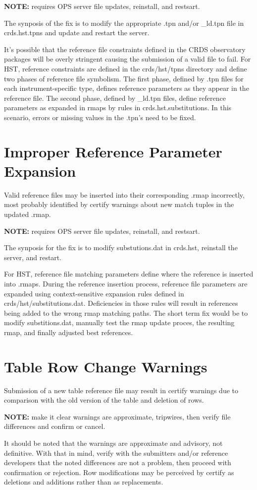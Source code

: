 \documentclass[letterpaper,10pt,english]{sphinxmanual}
\begin{document}
\textbf{NOTE:} requires OPS server file updates, reinstall, and restsart.

The synposis of the fix is to modify the appropriate .tpn and/or \_ld.tpn file in crds.hst.tpns and update and
restart the server.

It's possible that the reference file constraints defined in the CRDS observatory packages will be overly stringent
causing the submission of a valid file to fail.   For HST,  reference constraints are defined in the crds/hst/tpns
directory and define two phases of reference file symbolism.   The first phase,  defined by .tpn files for each
instrument-specific type,  defines reference parameters as they appear in the reference file.  The second phase,
defined by \_ld.tpn files,  define reference parameters as expanded in rmaps by rules in crds.hst.substitutions.
In this scenario,  errors or missing values in the .tpn's need to be fixed.


\section{Improper Reference Parameter Expansion}
\label{server_guide:improper-reference-parameter-expansion}
Valid reference files may be inserted into their corresponding .rmap incorrectly,  most probably identified
by certify warnings about new match tuples in the updated .rmap.

\textbf{NOTE:} requires OPS server file updates, reinstall, and restsart.

The synposis for the fix is to modify substutions.dat in crds.hst,  reinstall the server, and restart.

For HST, reference file matching parameters define where the reference is inserted into .rmaps.
During the reference insertion process,  reference file parameters are expanded using context-sensitive expansion
rules defined in crds/hst/substitutions.dat.  Deficiencies in those rules will result in references being added
to the wrong rmap matching paths.   The short term fix would be to modify substitions.dat,  manually test the rmap
update proces, the resulting rmap, and finally adjusted best references.


\section{Table Row Change Warnings}
\label{server_guide:table-row-change-warnings}
Submission of a new table reference file may result in certify warnings due to comparison with the old version
of the table and deletion of rows.

\textbf{NOTE:}  make it clear warnings are approximate, tripwires, then verify file differences and confirm or cancel.

It should be noted that the warnings are approximate and advisory,  not  definitive.   With that in mind,  verify with
the submitters and/or reference developers that the noted differences are not a problem,  then proceed with
confirmation or rejection.  Row modifications may be perceived by certify as deletions and additions rather than as
replacements.



\renewcommand{\indexname}{Index}
\printindex
\end{document}
